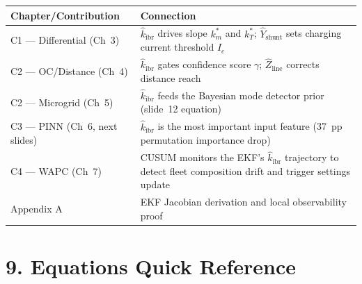 \documentclass[12pt,a4paper]{article}
\begin{document}
\begin{center}
\begin{tabular}{@{}lp{10cm}@{}}
\toprule
\textbf{Chapter/Contribution} & \textbf{Connection}\\
\midrule
C1 — Differential (Ch~3) & $\hat{k}_\mathrm{ibr}$ drives slope $k_m^*$ and
  $k_T^*$; $\hat{Y}_\mathrm{shunt}$ sets charging current threshold $I_c$\\
C2 — OC/Distance (Ch~4) & $\hat{k}_\mathrm{ibr}$ gates confidence score $\gamma$;
  $\hat{Z}_\mathrm{line}$ corrects distance reach\\
C2 — Microgrid (Ch~5) & $\hat{k}_\mathrm{ibr}$ feeds the Bayesian mode detector
  prior (slide~12 equation)\\
C3 — PINN (Ch~6, next slides) & $\hat{k}_\mathrm{ibr}$ is the most important
  input feature (37~pp permutation importance drop)\\
C4 — WAPC (Ch~7) & CUSUM monitors the EKF's $\hat{k}_\mathrm{ibr}$ trajectory
  to detect fleet composition drift and trigger settings update\\
Appendix A & EKF Jacobian derivation and local observability proof\\
\bottomrule
\end{tabular}
\end{center}

\section{9.\; Equations Quick Reference}
\end{document}
